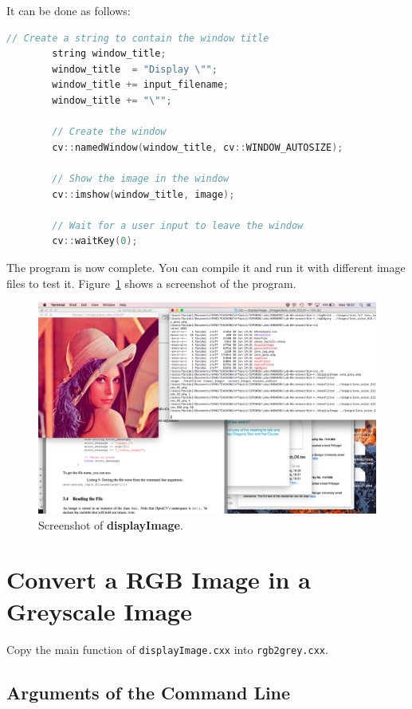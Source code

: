 \documentclass[english,a4paper,12pt,oneside]{article}
\begin{document}
It can be done as follows:
\begin{lstlisting}[language=c++,caption=Create an image.]
        // Create a string to contain the window title
        string window_title;
        window_title  = "Display \"";
        window_title += input_filename;
        window_title += "\"";

        // Create the window
        cv::namedWindow(window_title, cv::WINDOW_AUTOSIZE);

        // Show the image in the window
        cv::imshow(window_title, image);

        // Wait for a user input to leave the window
        cv::waitKey(0);
\end{lstlisting}

The program is now complete. 
You can compile it and run it with different image files to test it.
Figure~\ref{fig:displayImage} shows a screenshot of the program. 

    \begin {figure}[htb]
			\centering
			\includegraphics[width=\textwidth]{displayImage}
      \caption{\label{fig:displayImage}Screenshot of \textbf{displayImage}.}
    \end {figure}

\section{Convert a RGB Image in a Greyscale Image}

Copy the main function of \verb+displayImage.cxx+ into \verb+rgb2grey.cxx+.

\subsection{Arguments of the Command Line}
\end{document}
